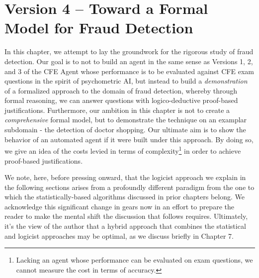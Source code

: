  
\chapter{Version 4 -- Toward a Formal Model for Fraud Detection}


In this chapter, we attempt to lay the groundwork for the rigorous study of fraud detection.  Our goal is to not to build an agent in the same sense as Versions 1, 2, and 3 of the CFE Agent whose performance is to be evaluated against CFE exam questions in the spirit of psychometric AI, but instead to build a \emph{demonstration} of a formalized approach to the domain of fraud detection, whereby through formal reasoning, we can answer questions with logico-deductive proof-based justifications.  Furthermore, our ambition in this chapter is not to create a \emph{comprehensive} formal model, but to demonstrate the technique on an examplar subdomain - the detection of doctor shopping.  Our ultimate aim is to show the behavior of an automated agent if it were built under this approach.  By doing so, we give an idea of the costs levied in terms of complexity\footnote{Lacking an agent whose performance can be evaluated on exam questions, we cannot measure the cost in terms of accuracy.} in order to achieve proof-based justifications.  

We note, here, before pressing onward, that the logicist approach we explain in the following sections arises from a profoundly different paradigm from the one to which the statistically-based algorithms discussed in prior chapters belong.  We acknowledge this significant change in gears now in an effort to prepare the reader to make the mental shift the discussion that follows requires.  Ultimately, it's the view of the author that a hybrid approach that combines the statistical and logicist approaches may be optimal, as we discuss briefly in Chapter 7.

